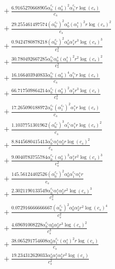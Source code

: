 \documentclass[10pt]{article}
\begin{document}
\begin{align*}
&{}  + \frac{6.9165270668905 \alpha_{0}^{c_s} \left(\alpha_{0}^s\right)^{2} \alpha_{3}^{c_s} r \log{\left(c_{s} \right)}}{c_{s}} \\
&{}  + \frac{29.255461497574 \left(\alpha_{0}^{c_s}\right)^{2} \alpha_{0}^s \left(\alpha_{1}^s\right)^{2} r \log{\left(c_{s} \right)}^{2}}{c_{s}} \\
&{}  + \frac{0.9424780878218 \left(\alpha_{0}^{c_s}\right)^{2} \alpha_{0}^s \alpha_{1}^s r^{3} \log{\left(c_{s} \right)}^{3}}{c_{s}^{3}} \\
&{}  + \frac{30.780492667285 \alpha_{0}^{c_s} \alpha_{0}^s \left(\alpha_{1}^s\right)^{2} r^{2} \log{\left(c_{s} \right)}^{2}}{c_{s}^{2}} \\
&{}  + \frac{16.166403940833 \alpha_{0}^{c_s} \left(\alpha_{0}^s\right)^{4} \alpha_{1}^{c_s} r \log{\left(c_{s} \right)}}{c_{s}} \\
&{}  + \frac{66.717509864214 \alpha_{0}^{c_s} \left(\alpha_{0}^s\right)^{2} \alpha_{1}^s r^{3} \log{\left(c_{s} \right)}}{c_{s}^{3}} \\
&{}  + \frac{17.265090188972 \alpha_{0}^{c_s} \left(\alpha_{1}^{c_s}\right)^{2} \alpha_{1}^s r \log{\left(c_{s} \right)}}{c_{s}} \\
&{}  + \frac{1.1037751301962 \left(\alpha_{0}^{c_s}\right)^{3} \alpha_{1}^{c_s} \alpha_{1}^s r \log{\left(c_{s} \right)}^{2}}{c_{s}} \\
&{}  + \frac{8.8445680415413 \alpha_{0}^{c_s} \alpha_{1}^s \alpha_{3}^s r \log{\left(c_{s} \right)}^{2}}{c_{s}} \\
&{}  + \frac{9.0040783755784 \alpha_{0}^{c_s} \left(\alpha_{0}^s\right)^{3} \alpha_{1}^s r^{2} \log{\left(c_{s} \right)}^{3}}{c_{s}^{2}} \\
&{}  + \frac{145.56124402526 \left(\alpha_{0}^{c_s}\right)^{2} \alpha_{0}^s \alpha_{1}^{c_s} \alpha_{1}^s r}{c_{s}} \\
&{}  + \frac{2.3021190133549 \alpha_{0}^{c_s} \alpha_{1}^s \alpha_{2}^s r^{2} \log{\left(c_{s} \right)}^{3}}{c_{s}^{2}} \\
&{}  + \frac{0.072916666666667 \left(\alpha_{0}^{c_s}\right)^{2} \alpha_{0}^s \alpha_{2}^s r^{2} \log{\left(c_{s} \right)}^{4}}{c_{s}^{2}} \\
&{}  + \frac{4.69691008228 \alpha_{0}^{c_s} \alpha_{0}^s \alpha_{2}^s r^{3} \log{\left(c_{s} \right)}^{2}}{c_{s}^{3}} \\
&{}  + \frac{38.065291754608 \alpha_{0}^s \alpha_{1}^{c_s} \left(\alpha_{1}^s\right)^{2} r \log{\left(c_{s} \right)}}{c_{s}} \\
&{}  + \frac{19.234312620033 \alpha_{0}^s \alpha_{1}^s \alpha_{2}^s r^{2} \log{\left(c_{s} \right)}}{c_{s}^{2}} \\

\end{align*}
\end{document}
